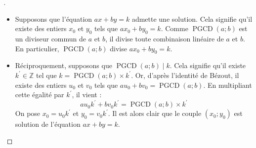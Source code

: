 \documentclass[12pt]{article}
\theoremstyle{break}
\newenvironment{demo}[1][\proofname]{%
  \begin{proof}[#1]$ $\newline
}{%
  \end{proof}
}
\begin{document}
\begin{demo}
\begin{itemize}[noitemsep,topsep=0pt]
  \item Supposons que l'équation $a x+b y=k$ admette une solution. Cela signifie qu'il existe des entiers $x_{0}$ et $y_{0}$ tels que $a x_{0}+b y_{0}=k$. Comme $\operatorname{PGCD}(a ; b)$ est un diviseur commun de $a$ et $b$, il divise toute combinaison linéaire de $a$ et $b$. En particulier, $\operatorname{PGCD}(a ; b)$ divise $a x_{0}+b y_{0}=k$.
  \item Réciproquement, supposons que $\operatorname{PGCD}(a ; b) \mid k$. Cela signifie qu'il existe $k^{\prime} \in \mathbb{Z}$ tel que $k=\operatorname{PGCD}(a ; b) \times k^{\prime}$. Or, d'après l'identité de Bézout, il existe des entiers $u_{0}$ et $v_{0}$ tels que $a u_{0}+b v_{0}=\operatorname{PGCD}(a ; b)$. En multipliant cette égalité par $k^{\prime}$, il vient :
  $$
  a u_{0} k^{\prime}+b v_{0} k^{\prime}=\operatorname{PGCD}(a ; b) \times k^{\prime}
  $$
  On pose $x_{0}=u_{0} k^{\prime}$ et $y_{0}=v_{0} k^{\prime}$. Il est alors clair que le couple $\left(x_{0} ; y_{0}\right)$ est solution de l'équation $a x+b y=k$.
\end{itemize}
\end{demo}
\end{document}
